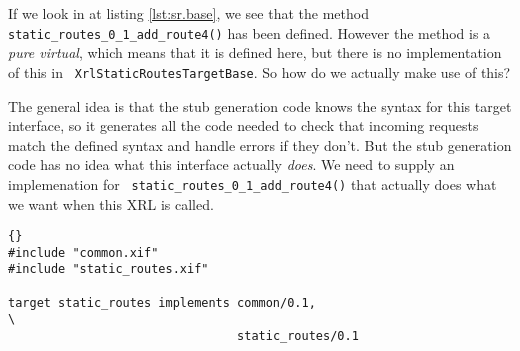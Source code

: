 \documentclass[11pt]{article}
\newcommand{\stt}{\tt\small}
\begin{document}
If we look in at listing \ref{lst:sr.base}, we see that the method
{\stt static\_routes\_0\_1\_add\_route4()} has been defined.  However the
method is a {\it pure virtual}, which means that it is defined here,
but there is no implementation of this in {\stt
XrlStaticRoutesTargetBase}.  So how do we actually make use of this?

The general idea is that the stub generation code knows the syntax for
this target interface, so it generates all the code needed to check
that incoming requests match the defined syntax and handle errors if
they don't.  But the stub generation code has no idea what this
interface actually {\it does}.  We need to supply an implemenation for {\stt
static\_routes\_0\_1\_add\_route4()} that actually does what we want when
this XRL is called.

\newpage
\begin{lstlisting}[caption={Contents of static\_routes.tgt %
                                     \label{lst:sr.tgt} } ]{}
#include "common.xif"
#include "static_routes.xif"

target static_routes implements common/0.1,                             \
                                static_routes/0.1
\end{lstlisting}
\end{document}
